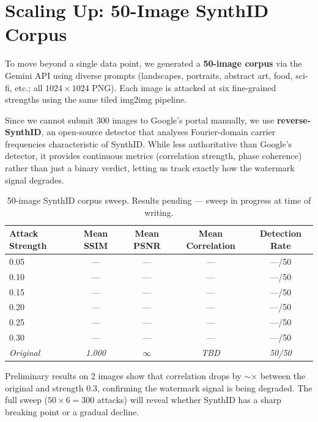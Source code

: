 \documentclass[11pt,a4paper]{article}
\begin{document}
\section{Scaling Up: 50-Image SynthID Corpus}

To move beyond a single data point, we generated a \textbf{50-image
corpus} via the Gemini API using diverse prompts (landscapes, portraits,
abstract art, food, sci-fi, etc.; all $1024 \times 1024$ PNG). Each
image is attacked at six fine-grained strengths using the same tiled
img2img pipeline.

Since we cannot submit 300 images to Google's portal manually, we use
\textbf{reverse-SynthID}, an open-source detector that analyses
Fourier-domain carrier frequencies characteristic of SynthID. While less
authoritative than Google's detector, it provides continuous metrics
(correlation strength, phase coherence) rather than just a binary
verdict, letting us track exactly how the watermark signal degrades.

\begin{table}[h]
\centering
\caption{50-image SynthID corpus sweep. Results pending --- sweep in
progress at time of writing.}
\label{tab:synthid-sweep}
\begin{tabular}{lcccc}
\toprule
\textbf{Attack Strength} & \textbf{Mean SSIM} & \textbf{Mean PSNR} &
\textbf{Mean Correlation} & \textbf{Detection Rate} \\
\midrule
0.05 & --- & --- & --- & ---/50 \\
0.10 & --- & --- & --- & ---/50 \\
0.15 & --- & --- & --- & ---/50 \\
0.20 & --- & --- & --- & ---/50 \\
0.25 & --- & --- & --- & ---/50 \\
0.30 & --- & --- & --- & ---/50 \\
\midrule
\textit{Original} & \textit{1.000} & $\infty$ & \textit{TBD} &
\textit{50/50} \\
\bottomrule
\end{tabular}
\end{table}

Preliminary results on 2 images show that correlation drops by
$\sim$$\times$ between the original and strength 0.3, confirming the
watermark signal is being degraded. The full sweep ($50 \times 6 = 300$
attacks) will reveal whether SynthID has a sharp breaking point or a
gradual decline.
\end{document}
